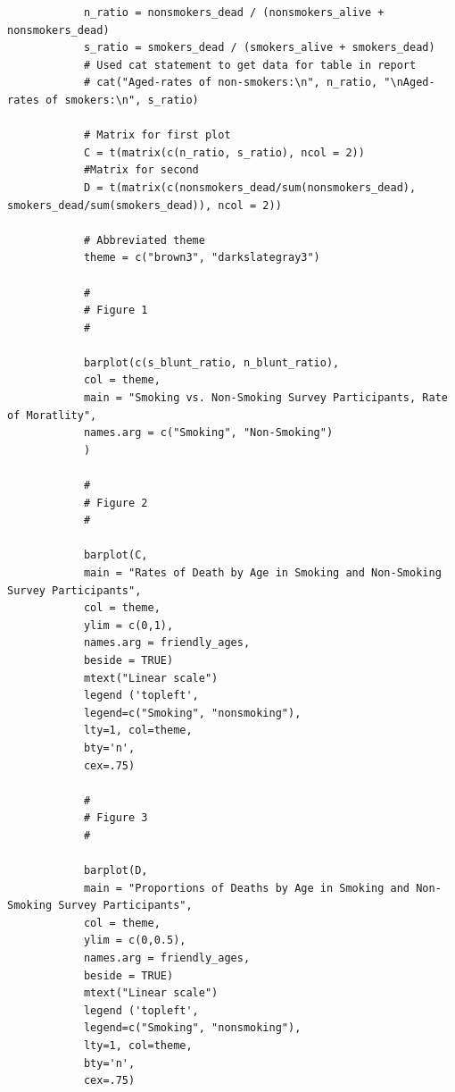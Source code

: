 \documentclass{article}
\begin{document}
\begin{enumerate}[\ \ (a)\ ]
\begin{verbatim}
			n_ratio = nonsmokers_dead / (nonsmokers_alive + nonsmokers_dead)
			s_ratio = smokers_dead / (smokers_alive + smokers_dead)
			# Used cat statement to get data for table in report
			# cat("Aged-rates of non-smokers:\n", n_ratio, "\nAged-rates of smokers:\n", s_ratio)
			
			# Matrix for first plot
			C = t(matrix(c(n_ratio, s_ratio), ncol = 2))
			#Matrix for second
			D = t(matrix(c(nonsmokers_dead/sum(nonsmokers_dead), smokers_dead/sum(smokers_dead)), ncol = 2))
			
			# Abbreviated theme
			theme = c("brown3", "darkslategray3")
			
			#
			# Figure 1
			#
			
			barplot(c(s_blunt_ratio, n_blunt_ratio),
			col = theme,
			main = "Smoking vs. Non-Smoking Survey Participants, Rate of Moratlity",
			names.arg = c("Smoking", "Non-Smoking")
			)
			
			#
			# Figure 2
			#
			
			barplot(C,
			main = "Rates of Death by Age in Smoking and Non-Smoking Survey Participants",
			col = theme, 
			ylim = c(0,1), 
			names.arg = friendly_ages,
			beside = TRUE)
			mtext("Linear scale")
			legend ('topleft', 
			legend=c("Smoking", "nonsmoking"),
			lty=1, col=theme,
			bty='n', 
			cex=.75)
			
			#
			# Figure 3
			#
			
			barplot(D,
			main = "Proportions of Deaths by Age in Smoking and Non-Smoking Survey Participants",
			col = theme, 
			ylim = c(0,0.5), 
			names.arg = friendly_ages,
			beside = TRUE)
			mtext("Linear scale")
			legend ('topleft', 
			legend=c("Smoking", "nonsmoking"),
			lty=1, col=theme,
			bty='n', 
			cex=.75)
			
		\end{verbatim}
	\end{enumerate}
\end{document}

